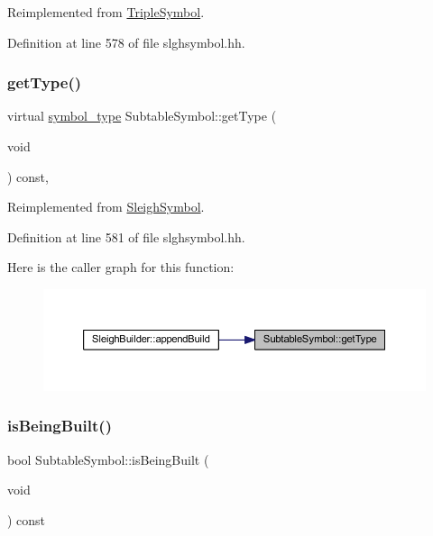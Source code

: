 Reimplemented from \mbox{\hyperlink{class_triple_symbol_a7351de4a1db140381d0b7913a8c613fd}{Triple\+Symbol}}.



Definition at line 578 of file slghsymbol.\+hh.

\mbox{\label{class_subtable_symbol_a79fa8a930541c8d4f25a5ce0b5c955e9}} 
\subsubsection{\texorpdfstring{getType()}{getType()}}
{\footnotesize\ttfamily virtual \mbox{\hyperlink{class_sleigh_symbol_aba70f7f332fd63488c5ec4bd7807db41}{symbol\+\_\+type}} Subtable\+Symbol\+::get\+Type (\begin{DoxyParamCaption}\item[{void}]{ }\end{DoxyParamCaption}) const\hspace{0.3cm}{\ttfamily [inline]}, {\ttfamily [virtual]}}



Reimplemented from \mbox{\hyperlink{class_sleigh_symbol_a2f6e5903e461084c29f95ea024883950}{Sleigh\+Symbol}}.



Definition at line 581 of file slghsymbol.\+hh.

Here is the caller graph for this function\+:
\nopagebreak
\begin{figure}[H]
\begin{center}
\leavevmode
\includegraphics[width=350pt]{class_subtable_symbol_a79fa8a930541c8d4f25a5ce0b5c955e9_icgraph}
\end{center}
\end{figure}
\mbox{\label{class_subtable_symbol_a450730a12be8f17b67c32d4dce1b7638}} 
\subsubsection{\texorpdfstring{isBeingBuilt()}{isBeingBuilt()}}
{\footnotesize\ttfamily bool Subtable\+Symbol\+::is\+Being\+Built (\begin{DoxyParamCaption}\item[{void}]{ }\end{DoxyParamCaption}) const\hspace{0.3cm}{\ttfamily [inline]}}



